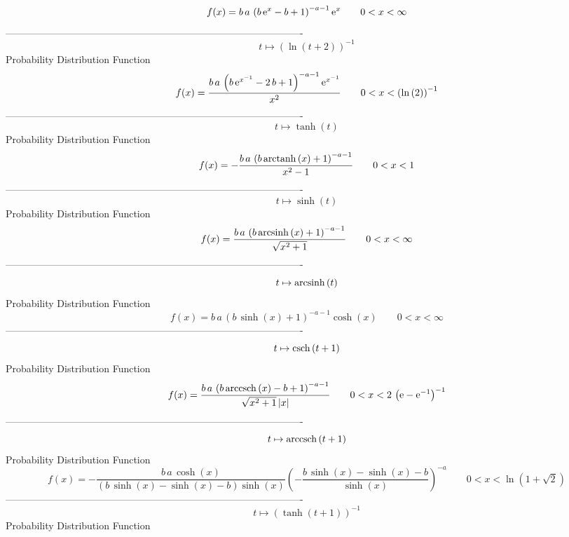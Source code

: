 \documentclass[12pt]{article}
\begin{document}
$$  f(x)=b\,a\, \left( b\,{{\rm e}^{x}}-b+1 \right) ^{-a-1}{{\rm e}^{x}}
 \qquad0
 < x < \infty 
$$-------------------------------------------------------------------------------------------  \\$$t\mapsto  \left( \ln  \left( t+2 \right)  \right) ^{-1}
$$Probability Distribution Function 
$$  f(x)={\frac {b\,a\, \left( b\,{{\rm e}^{{x}^{-1}}}-2\,b+1 \right) ^{-a-1}{
{\rm e}^{{x}^{-1}}}}{{x}^{2}}}
 \qquad0
 < x <  \left( \ln  \left( 2 \right)  \right) ^{-1}
$$-------------------------------------------------------------------------------------------  \\$$t\mapsto \tanh \left( t \right) 
$$Probability Distribution Function 
$$  f(x)=-{\frac {b\,a\, \left( b\,{\rm arctanh} \left(x\right)+1 \right) ^{-a-
1}}{{x}^{2}-1}}
 \qquad0
 < x < 1
$$-------------------------------------------------------------------------------------------  \\$$t\mapsto \sinh \left( t \right) 
$$Probability Distribution Function 
$$  f(x)={\frac {b\,a\, \left( b\,{\rm arcsinh} \left(x\right)+1 \right) ^{-a-1
}}{\sqrt {{x}^{2}+1}}}
 \qquad0
 < x < \infty 
$$-------------------------------------------------------------------------------------------  \\$$t\mapsto {\rm arcsinh} \left(t\right)
$$Probability Distribution Function 
$$  f(x)=b\,a\, \left( b\,\sinh \left( x \right) +1 \right) ^{-a-1}\cosh
 \left( x \right) 
 \qquad0
 < x < \infty 
$$-------------------------------------------------------------------------------------------  \\$$t\mapsto {\rm csch} \left(t+1\right)
$$Probability Distribution Function 
$$  f(x)={\frac {b\,a\, \left( b\,{\rm arccsch} \left(x\right)-b+1 \right) ^{-a
-1}}{\sqrt {{x}^{2}+1} \left| x \right| }}
 \qquad0
 < x < 2\, \left( {\rm e}-{{\rm e}^{-1}} \right) ^{-1}
$$-------------------------------------------------------------------------------------------  \\$$t\mapsto {\rm arccsch} \left(t+1\right)
$$Probability Distribution Function 
$$  f(x)=-{\frac {b\,a\,\cosh \left( x \right) }{ \left( b\,\sinh \left( x
 \right) -\sinh \left( x \right) -b \right) \sinh \left( x \right) }
 \left( -{\frac {b\,\sinh \left( x \right) -\sinh \left( x \right) -b
}{\sinh \left( x \right) }} \right) ^{-a}}
 \qquad0
 < x < \ln  \left( 1+\sqrt {2} \right) 
$$-------------------------------------------------------------------------------------------  \\$$t\mapsto  \left( \tanh \left( t+1 \right)  \right) ^{-1}
$$Probability Distribution Function 
\end{document}
